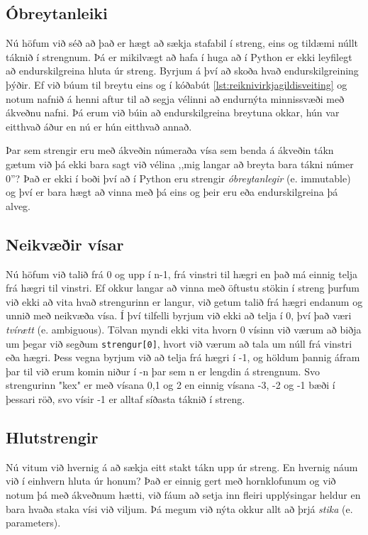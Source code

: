 \subsection{Óbreytanleiki}
Nú höfum við séð að það er hægt að sækja stafabil í streng, eins og tildæmi núllt táknið í strengnum.
Þá er mikilvægt að hafa í huga að í Python er ekki leyfilegt að endurskilgreina hluta úr streng.
Byrjum á því að skoða hvað endurskilgreining þýðir.
Ef við búum til breytu eins og í kóðabút \ref{lst:reiknivirkjagildisveiting} og notum nafnið á henni aftur til að segja vélinni að endurnýta minnissvæði með ákveðnu nafni.
Þá erum við búin að endurskilgreina breytuna okkar, hún var eitthvað áður en nú er hún eitthvað annað.

Þar sem strengir eru með ákveðin númeraða vísa sem benda á ákveðin tákn gætum við þá ekki bara sagt við vélina ,,mig langar að breyta bara tákni númer 0''?
Það er ekki í boði því að í Python eru strengir \emph{óbreytanlegir} (e. immutable) og því er bara hægt að vinna með þá eins og þeir eru eða endurskilgreina þá alveg.

\subsection{Neikvæðir vísar}
Nú höfum við talið frá 0 og upp í n-1, frá vinstri til hægri en það má einnig telja frá hægri til vinstri.
Ef okkur langar að vinna með öftustu stökin í streng þurfum við ekki að vita hvað strengurinn er langur, við getum talið frá hægri endanum og unnið með neikvæða vísa.
Í því tilfelli byrjum við ekki að telja í 0, því það væri \emph{tvírætt} (e. ambiguous).
Tölvan myndi ekki vita hvorn 0 vísinn við værum að biðja um þegar við segðum \texttt{strengur[0]}, hvort við værum að tala um núll frá vinstri eða hægri.
Þess vegna byrjum við að telja frá hægri í -1, og höldum þannig áfram þar til við erum komin niður í -n þar sem n er lengdin á strengnum.
Svo strengurinn "kex" er með vísana 0,1 og 2 en einnig vísana -3, -2 og -1 bæði í þessari röð, svo vísir -1 er alltaf síðasta táknið í streng.

\subsection{Hlutstrengir}
Nú vitum við hvernig á að sækja eitt stakt tákn upp úr streng.
En hvernig náum við í einhvern hluta úr honum?
Það er einnig gert með hornklofunum og við notum þá með ákveðnum hætti, við fáum að setja inn fleiri upplýsingar heldur en bara hvaða staka vísi við viljum.
Þá megum við nýta okkur allt að þrjá \emph{stika} (e. parameters).

